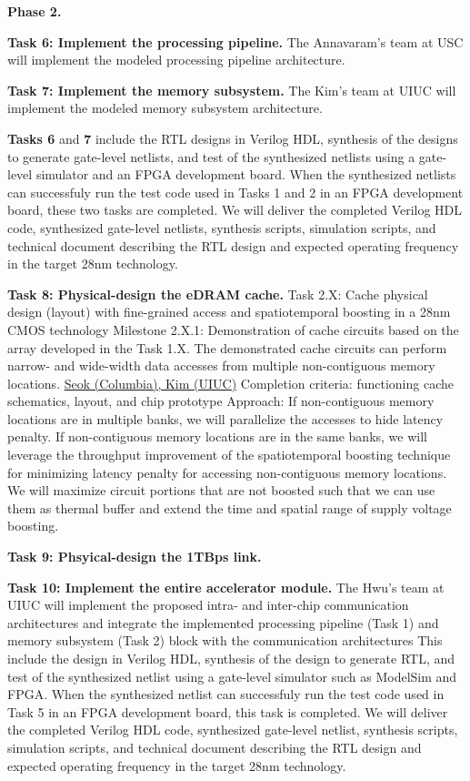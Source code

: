 \noindent
\textbf{Phase 2.}

\noindent
\textbf{Task 6: Implement the processing pipeline.} 
The Annavaram's team at USC will implement the modeled processing pipeline architecture.


\noindent
\textbf{Task 7: Implement the memory subsystem.} 
The Kim's team at UIUC will implement the modeled memory subsystem architecture.

\noindent
\textbf{Tasks 6} and \textbf{7} include the RTL designs in Verilog HDL, synthesis of the designs to generate gate-level netlists, and test of the synthesized netlists using a gate-level simulator and an FPGA development board.
When the synthesized netlists can successfuly run the test code used in Tasks 1 and 2 in an FPGA development board, these two tasks are completed.
We will deliver the completed Verilog HDL code, synthesized gate-level netlists, synthesis scripts, simulation scripts, and technical document describing the RTL design and expected operating frequency in the target 28nm technology.

\noindent
\textbf{Task 8: Physical-design the eDRAM cache.} 
Task 2.X: Cache physical design (layout) with fine-grained access and spatiotemporal boosting in a 28nm CMOS technology
Milestone 2.X.1: Demonstration of cache circuits based on the array developed in the Task 1.X. The demonstrated cache circuits can perform narrow- and wide-width data accesses from multiple non-contiguous memory locations. \underline{Seok (Columbia), Kim (UIUC)}
Completion criteria: functioning cache schematics, layout, and chip prototype
Approach: If non-contiguous memory locations are in multiple banks, we will parallelize the accesses to hide latency penalty. If non-contiguous memory locations are in the same banks, we will leverage the throughput improvement of the spatiotemporal boosting technique for minimizing latency penalty for accessing non-contiguous memory locations. We will maximize circuit portions that are not boosted such that we can use them as thermal buffer and extend the time and spatial range of supply voltage boosting. 


\noindent
\textbf{Task 9: Phsyical-design the 1TBps link.} 

\noindent
\textbf{Task 10: Implement the entire accelerator module.} 
The Hwu's team at UIUC will implement the proposed intra- and inter-chip communication architectures and integrate the implemented processing pipeline (Task 1) and memory subsystem (Task 2) block with the communication architectures 
This include the design in Verilog HDL, synthesis of the design to generate RTL, and test of the synthesized netlist using a gate-level simulator such as ModelSim and FPGA.
When the synthesized netlist can successfuly run the test code used in Task 5 in an FPGA development board, this task is completed.
We will deliver the completed Verilog HDL code, synthesized gate-level netlist, synthesis scripts, simulation scripts, and technical document describing the RTL design and expected operating frequency in the target 28nm technology.

